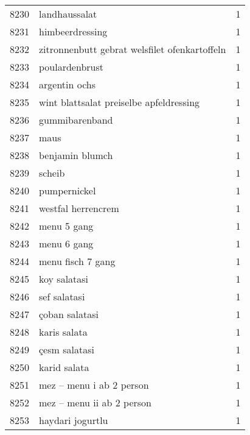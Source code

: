 \begin{tabular}{llr}
8230 &                                      landhaussalat &      1 \\
8231 &                                    himbeerdressing &      1 \\
8232 &      zitronnenbutt gebrat welsfilet ofenkartoffeln &      1 \\
8233 &                                     poulardenbrust &      1 \\
8234 &                                      argentin ochs &      1 \\
8235 &            wint blattsalat preiselbe apfeldressing &      1 \\
8236 &                                     gummibarenband &      1 \\
8237 &                                               maus &      1 \\
8238 &                                    benjamin blumch &      1 \\
8239 &                                             scheib &      1 \\
8240 &                                       pumpernickel &      1 \\
8241 &                                 westfal herrencrem &      1 \\
8242 &                                        menu 5 gang &      1 \\
8243 &                                        menu 6 gang &      1 \\
8244 &                                  menu fisch 7 gang &      1 \\
8245 &                                       koy salatasi &      1 \\
8246 &                                       sef salatasi &      1 \\
8247 &                                     çoban salatasi &      1 \\
8248 &                                       karis salata &      1 \\
8249 &                                      çesm salatasi &      1 \\
8250 &                                       karid salata &      1 \\
8251 &                           mez – menu i ab 2 person &      1 \\
8252 &                          mez – menu ii ab 2 person &      1 \\
8253 &                                   haydari jogurtlu &      1 \\

\end{tabular}
